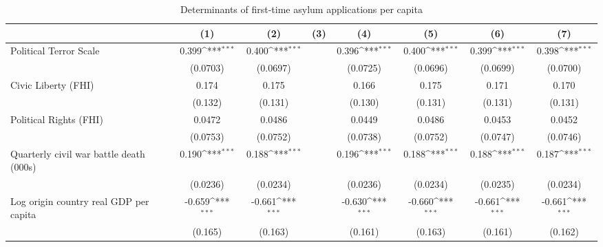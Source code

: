 \begin{table}[htbp]\centering
\def\sym#1{\ifmmode^{#1}\else\(^{#1}\)\fi}
\caption{Determinants of first-time asylum applications per capita}
\begin{tabular}{l*{7}{c}}
\hline\hline
                    &\multicolumn{1}{c}{(1)}         &\multicolumn{1}{c}{(2)}         &\multicolumn{1}{c}{(3)}         &\multicolumn{1}{c}{(4)}         &\multicolumn{1}{c}{(5)}         &\multicolumn{1}{c}{(6)}         &\multicolumn{1}{c}{(7)}         \\
\hline
Political Terror Scale&       0.399\sym{***}&       0.400\sym{***}&                     &       0.396\sym{***}&       0.400\sym{***}&       0.399\sym{***}&       0.398\sym{***}\\
                    &    (0.0703)         &    (0.0697)         &                     &    (0.0725)         &    (0.0696)         &    (0.0699)         &    (0.0700)         \\
[1em]
Civic Liberty (FHI) &       0.174         &       0.175         &                     &       0.166         &       0.175         &       0.171         &       0.170         \\
                    &     (0.132)         &     (0.131)         &                     &     (0.130)         &     (0.131)         &     (0.131)         &     (0.131)         \\
[1em]
Political Rights (FHI)&      0.0472         &      0.0486         &                     &      0.0449         &      0.0486         &      0.0453         &      0.0452         \\
                    &    (0.0753)         &    (0.0752)         &                     &    (0.0738)         &    (0.0752)         &    (0.0747)         &    (0.0746)         \\
[1em]
Quarterly civil war battle death (000s)&       0.190\sym{***}&       0.188\sym{***}&                     &       0.196\sym{***}&       0.188\sym{***}&       0.188\sym{***}&       0.187\sym{***}\\
                    &    (0.0236)         &    (0.0234)         &                     &    (0.0236)         &    (0.0234)         &    (0.0235)         &    (0.0234)         \\
[1em]
Log origin country real GDP per capita&      -0.659\sym{***}&      -0.661\sym{***}&                     &      -0.630\sym{***}&      -0.660\sym{***}&      -0.661\sym{***}&      -0.661\sym{***}\\
                    &     (0.165)         &     (0.163)         &                     &     (0.161)         &     (0.163)         &     (0.161)         &     (0.162)         \\

\end{tabular}
\end{table}
